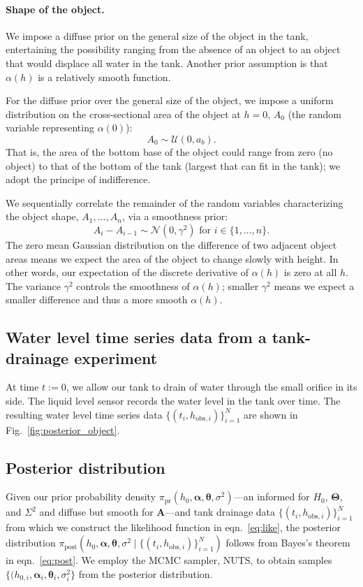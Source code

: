 \documentclass[openacc]{rsproca_new}%
\newcommand\thedata {$\{(t_i,h_{\text{obs}, i})\}_{i=1}^{N}$\xspace}
\newcommand\thedatanomath {\{(t_i,h_{\text{obs}, i})\}_{i=1}^{N}}
\begin{document}
\vspace{-\baselineskip}
\paragraph{Shape of the object.}
We impose a diffuse prior on the general size of the object in the tank, entertaining the possibility ranging from the absence of an object to an object that would displace all water in the tank. 
Another prior assumption is that $\alpha(h)$ is a relatively smooth function.

For the diffuse prior over the general size of the object, we impose a uniform distribution on the cross-sectional area of the object at $h=0$, $A_0$ (the random variable representing $\alpha(0)$):
\begin{equation}
	A_0 \sim \mathcal{U}(0, a_b).
\end{equation}
That is, the area of the bottom base of the object could range from zero (no object) to that of the bottom of the tank (largest that can fit in the tank); we adopt the principe of indifference. 

We sequentially correlate the remainder of the random variables characterizing the object shape, $A_1, ..., A_n$, via a smoothness prior: 
\begin{equation}
 A_i - A_{i-1} \sim \mathcal{N}(0, \gamma^2) \text{ for } i \in \{1, ..., n\}.
\end{equation} 
The zero mean Gaussian distribution on the difference of two adjacent object areas means we expect the area of the object to change slowly with height. In other words, our expectation of the discrete derivative of $\alpha(h)$ is zero at all $h$. 
The variance $\gamma^2$ controls the smoothness of $\alpha(h)$; smaller $\gamma^2$ means we expect a smaller difference and thus a more smooth $\alpha(h)$. 


\subsection{Water level time series data from a tank-drainage experiment}
At time $t:=0$, we allow our tank to drain of water through the small orifice in its side. The liquid level sensor records the water level in the tank over time. The resulting water level time series data \thedata are shown in Fig.~\ref{fig:posterior_object}.

\subsection{Posterior distribution}
Given our prior probability density $\pi_{\text{pr}}(h_0, \boldsymbol \alpha, \boldsymbol \theta, \sigma^2)$---an informed for $H_0$, $\boldsymbol \Theta$, and $\Sigma^2$ and diffuse but smooth for $\mathbf{A}$---and tank drainage data \thedata from which we construct the likelihood function in eqn.~\ref{eq:like}, the posterior distribution $\pi_{\text{post}}(h_0, \boldsymbol \alpha, \boldsymbol \theta, \sigma^2 \mid \thedatanomath)$ follows from Bayes's theorem in eqn.~\ref{eq:post}. 
We employ the MCMC sampler, NUTS, to obtain samples $\{(h_{0,i}, \boldsymbol \alpha_i, \boldsymbol \theta_i, \sigma^2_i\}$ from the posterior distribution. 
 
\end{document}
